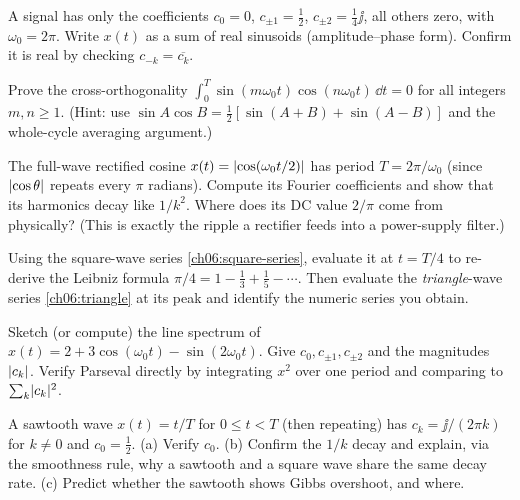 \begin{exercise}
A signal has only the coefficients \(c_0=0\), \(c_{\pm1}=\tfrac12\), \(c_{\pm2}=\tfrac14 \jj\),
all others zero, with \(\omega_0=2\pi\). Write \(x(t)\) as a sum of real sinusoids
(amplitude--phase form). Confirm it is real by checking \(c_{-k}=\overline{c_k}\).
\end{exercise}

\begin{exercise}
Prove the cross-orthogonality \(\int_0^T \sin(m\omega_0 t)\cos(n\omega_0 t)\,\dd t = 0\)
for all integers \(m,n\ge1\). (Hint: use \(\sin A\cos B=\tfrac12[\sin(A+B)+\sin(A-B)]\) and
the whole-cycle averaging argument.)
\end{exercise}

\begin{exercise}
The full-wave rectified cosine \(x(t)=\lvert\cos(\omega_0 t/2)\rvert\) has period \(T=2\pi/\omega_0\)
(since \(\lvert\cos\theta\rvert\) repeats every \(\pi\) radians). Compute its Fourier
coefficients and show that its harmonics decay like \(1/k^2\). Where does its DC
value \(2/\pi\) come from physically? (This is exactly the ripple a rectifier feeds into a
power-supply filter.)
\end{exercise}

\begin{exercise}
Using the square-wave series \eqref{ch06:square-series}, evaluate it at \(t=T/4\) to
re-derive the Leibniz formula \(\pi/4 = 1-\tfrac13+\tfrac15-\cdots\). Then evaluate the
\emph{triangle}-wave series \eqref{ch06:triangle} at its peak and identify the numeric
series you obtain.
\end{exercise}

\begin{exercise}
Sketch (or compute) the line spectrum of \(x(t)=2 + 3\cos(\omega_0 t) - \sin(2\omega_0 t)\).
Give \(c_0, c_{\pm1}, c_{\pm2}\) and the magnitudes \(\lvert c_k\rvert\). Verify Parseval directly
by integrating \(x^2\) over one period and comparing to \(\sum_k\lvert c_k\rvert^2\).
\end{exercise}

\begin{exercise}
A sawtooth wave \(x(t)=t/T\) for \(0\le t<T\) (then repeating) has
\(c_k = \jj/(2\pi k)\) for \(k\ne0\) and \(c_0=\tfrac12\). (a) Verify \(c_0\). (b) Confirm
the \(1/k\) decay and explain, via the smoothness rule, why a sawtooth and a square wave
share the same decay rate. (c) Predict whether the sawtooth shows Gibbs overshoot, and
where.
\end{exercise}

